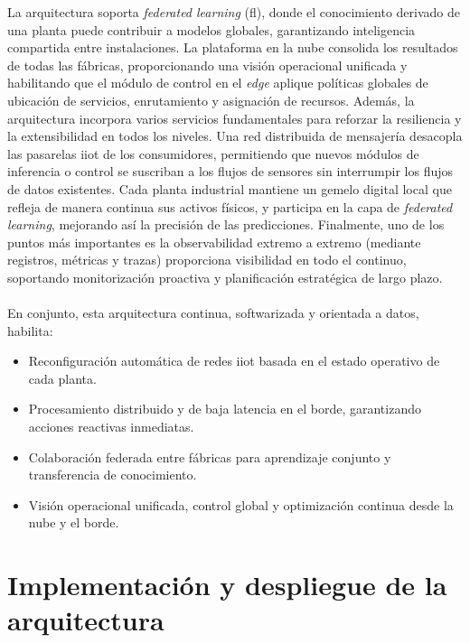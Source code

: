 La arquitectura soporta \textit{federated learning} (\gls{fl}), donde el conocimiento derivado de una planta puede contribuir a modelos globales, garantizando inteligencia compartida entre instalaciones. La plataforma en la nube consolida los resultados de todas las fábricas, proporcionando una visión operacional unificada y habilitando que el módulo de control en el \textit{edge} aplique políticas globales de ubicación de servicios, enrutamiento y asignación de recursos. Además, la arquitectura incorpora varios servicios fundamentales para reforzar la resiliencia y la extensibilidad en todos los niveles. Una red distribuida de mensajería desacopla las pasarelas \gls{iiot} de los consumidores, permitiendo que nuevos módulos de inferencia o control se suscriban a los flujos de sensores sin interrumpir los flujos de datos existentes. Cada planta industrial mantiene un gemelo digital local que refleja de manera continua sus activos físicos, y participa en la capa de \textit{federated learning}, mejorando así la precisión de las predicciones. Finalmente, uno de los puntos más importantes es la observabilidad extremo a extremo (mediante registros, métricas y trazas) proporciona visibilidad en todo el continuo, soportando monitorización proactiva y planificación estratégica de largo plazo.\\
\\
En conjunto, esta arquitectura continua, softwarizada y orientada a datos,  habilita:
\begin{itemize}
  \item Reconfiguración automática de redes \gls{iiot} basada en el estado operativo de cada planta.
  \item Procesamiento distribuido y de baja latencia en el borde, garantizando acciones reactivas inmediatas.
  \item Colaboración federada entre fábricas para aprendizaje conjunto y transferencia de conocimiento.
  \item Visión operacional unificada, control global y optimización continua desde la nube y el borde.
\end{itemize} 

\section{Implementación y despliegue de la arquitectura}

